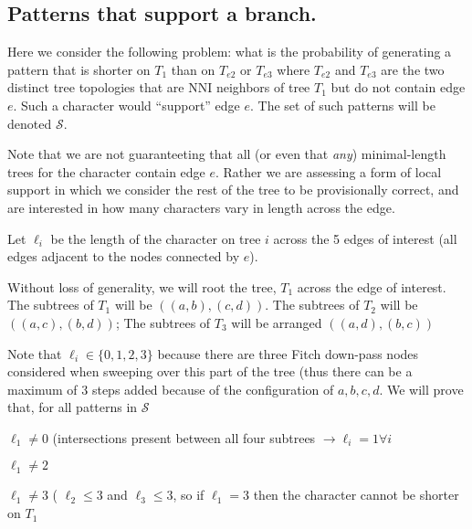 \documentclass[11pt]{article}
\begin{document}
\subsection{Patterns that support a branch.}
Here we consider the following problem: what is the probability of generating a pattern that is shorter on $T_1$ than on $T_{e2}$ or $T_{e3}$ where $T_{e2}$ and $T_{e3}$ are the two distinct tree topologies that are NNI neighbors of tree $T_1$ but do not contain edge $e$.
Such a character would ``support'' edge $e$.
The set of such patterns will be denoted $\mathcal{S}$.

Note that we are not guaranteeting that all (or even that {\em any}) minimal-length trees  for the character contain edge $e$. 
Rather we are assessing a form of local support in which we consider the rest of the tree to be provisionally correct, and are interested in how many characters vary in length across the edge.


Let $\ell_i$ be the length of the character on tree $i$ across the 5 edges of interest (all edges adjacent to the nodes connected by $e$).

Without loss of generality, we will root the tree, $T_1$ across the edge of interest.
The subtrees of $T_1$ will be $((a,b),(c,d))$. The subtrees of $T_2$ will be $((a,c),(b,d))$; The subtrees of $T_3$ will be arranged $((a,d),(b,c))$




Note that $\ell_i \in \{0, 1, 2, 3\}$ because there are three Fitch down-pass nodes considered when sweeping over this part of the tree (thus there can be a maximum of 3 steps added because of the configuration of $a,b,c,d$.
We will prove that, for all patterns in $\mathcal{S}$
\begin{compactenum}
	\item  $\ell_1 \neq 0$  (intersections present between all four subtrees $\rightarrow \ell_i = 1 \forall i$
	\item  $\ell_1 \neq 2$
	\item  $\ell_1 \neq 3$ ( $\ell_2 \leq 3$ and $\ell_3 \leq 3$, so if $\ell_1=3$ then the character cannot be shorter on $T_1$
\end{compactenum}


\end{document}
